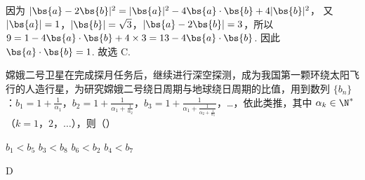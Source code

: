 \begin{solution}
因为
\(|\bs{a}-2\bs{b}|^2=|\bs{a}|^2-4\bs{a}\cdot\bs{b}+4|\bs{b}|^2\)，
又 \(|\bs{a}|=1\)，\(|\bs{b}|=\sqrt{3}\)，\(|\bs{a}-2\bs{b}|=3\)，所以
\(9=1-4\bs{a}\cdot\bs{b}+4\times 3=13-4\bs{a}\cdot\bs{b}\).
因此
\(\bs{a}\cdot\bs{b}=1\).
故选 C.
\end{solution}

\begin{problem}
嫦娥二号卫星在完成探月任务后，继续进行深空探测，成为我国第一颗环绕太阳飞行的人造行星，为研究嫦娥二号绕日周期与地球绕日周期的比值，用到数列 \(\{b_n\}\)：\(b_1=1+\frac{1}{\alpha_1}\)，\(b_2=1+\frac{1}{\alpha_1+\frac{1}{\alpha_2}}\)，\(b_3=1+\frac{1}{\alpha_1+\frac{1}{\alpha_2+\frac{1}{\alpha_3}}}\)，…，依此类推，其中 \(\alpha_k\in\N^*\)（\(k=1\)，\(2\)，\(\dots\)），则（\quad）

\choices
    {\(b_1<b_5\)}
    {\(b_3<b_8\)}
    {\(b_6<b_2\)}
    {\(b_4<b_7\)}
\end{problem}

\begin{answer}
D
\end{answer}

